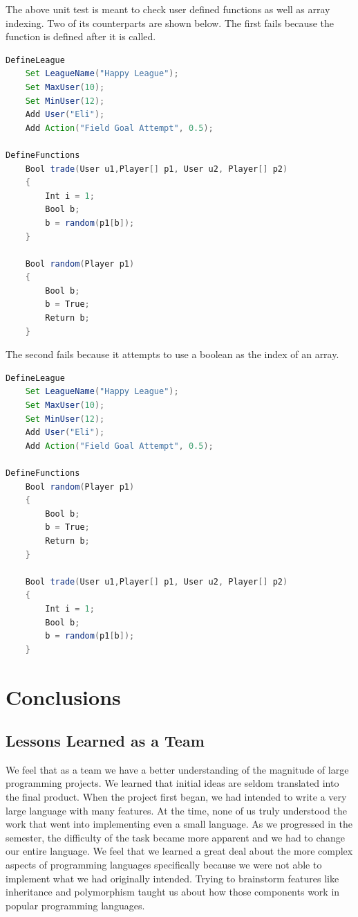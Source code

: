 \documentclass[12pt]{report}
\begin{document}
The above unit test is meant to check user defined functions as well as array indexing. Two of its counterparts are shown below. The first fails because the function is defined after it is called.

\begin{singlespace}
\begin{lstlisting}[language=Java,label=some-code,caption={array$\_$var$\_$index.fld}]
DefineLeague
	Set LeagueName("Happy League");
	Set MaxUser(10);
	Set MinUser(12);
	Add User("Eli");
	Add Action("Field Goal Attempt", 0.5);

DefineFunctions
	Bool trade(User u1,Player[] p1, User u2, Player[] p2)
	{
		Int i = 1;
		Bool b;
		b = random(p1[b]);
	}

	Bool random(Player p1)
	{
		Bool b;
		b = True;
		Return b;
	}
\end{lstlisting}
\end{singlespace}

The second fails because it attempts to use a boolean as the index of an array.

\begin{singlespace}
\begin{lstlisting}[language=Java,label=some-code,caption={array$\_$var$\_$index.fld}]
DefineLeague
	Set LeagueName("Happy League");
	Set MaxUser(10);
	Set MinUser(12);
	Add User("Eli");
	Add Action("Field Goal Attempt", 0.5);

DefineFunctions
	Bool random(Player p1)
	{
		Bool b;
		b = True;
		Return b;
	}

	Bool trade(User u1,Player[] p1, User u2, Player[] p2)
	{
		Int i = 1;
		Bool b;
		b = random(p1[b]);
	}
\end{lstlisting}
\end{singlespace}

\chapter{Conclusions}

\section{Lessons Learned as a Team}

We feel that as a team we have a better understanding of the magnitude of large programming projects. We learned that initial ideas are seldom translated into the final product. When the project first began, we had intended to write a very large language with many features. At the time, none of us truly understood the work that went into implementing even a small language. As we progressed in the semester, the difficulty of the task became more apparent and we had to change our entire language. We feel that we learned a great deal about the more complex aspects of programming languages specifically because we were not able to implement what we had originally intended. Trying to brainstorm features like inheritance and polymorphism taught us about how those components work in popular programming languages. 
\end{document}
